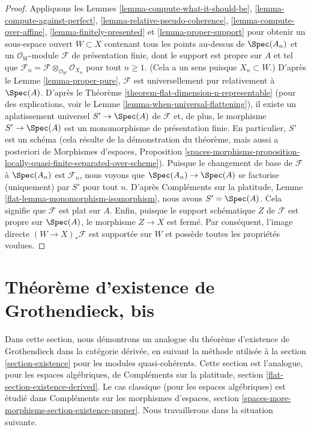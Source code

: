 \begin{proof}
Appliquons les Lemmes \ref{lemma-compute-what-it-should-be},
\ref{lemma-compute-against-perfect},
\ref{lemma-relative-pseudo-coherence},
\ref{lemma-compute-over-affine},
\ref{lemma-finitely-presented} et
\ref{lemma-proper-support}
pour obtenir un sous-espace ouvert $W \subset X$ contenant tous les points
au-dessus de $\Spec(A_n)$
et un $\mathcal{O}_W$-module $\mathcal{F}$ de présentation finie,
dont le support est propre sur $A$ et tel que
$\mathcal{F}_n = \mathcal{F} \otimes_{\mathcal{O}_W} \mathcal{O}_{X_n}$
pour tout $n \geq 1$. (Cela a un sens puisque $X_n \subset W$.)
D'après le Lemme \ref{lemma-proper-pure}, $\mathcal{F}$
est universellement pur relativement à $\Spec(A)$.
D'après le Théorème \ref{theorem-flat-dimension-n-representable}
(pour des explications, voir le Lemme \ref{lemma-when-universal-flattening}),
il existe un aplatissement universel $S' \to \Spec(A)$
de $\mathcal{F}$ et, de plus, le morphisme $S' \to \Spec(A)$
est un monomorphisme de présentation finie.
En particulier, $S'$ est un schéma (cela résulte de la démonstration
du théorème, mais aussi a posteriori de
Morphismes d'espaces, Proposition
\ref{spaces-morphisms-proposition-locally-quasi-finite-separated-over-scheme}).
Puisque le changement de base de $\mathcal{F}$ à $\Spec(A_n)$
est $\mathcal{F}_n$, nous voyons que $\Spec(A_n) \to \Spec(A)$
se factorise (uniquement) par $S'$ pour tout $n$.
D'après Compléments sur la platitude, Lemme \ref{flat-lemma-monomorphism-isomorphism},
nous avons $S' = \Spec(A)$.
Cela signifie que $\mathcal{F}$ est plat sur $A$.
Enfin, puisque le support schématique $Z$ de $\mathcal{F}$
est propre sur $\Spec(A)$, le morphisme $Z \to X$ est fermé.
Par conséquent, l'image directe $(W \to X)_*\mathcal{F}$ est supportée
sur $W$ et possède toutes les propriétés voulues.
\end{proof}







\section{Théorème d'existence de Grothendieck, bis}
\label{section-existence-derived}

\noindent
Dans cette section, nous démontrons un analogue du théorème d'existence de Grothendieck
dans la catégorie dérivée, en suivant la méthode utilisée à la
section \ref{section-existence} pour les modules quasi-cohérents.
Cette section est l'analogue, pour les espaces algébriques, de
Compléments sur la platitude, section \ref{flat-section-existence-derived}.
Le cas classique (pour les espaces algébriques)
est étudié dans Compléments sur les morphismes d'espaces, section
\ref{spaces-more-morphisms-section-existence-proper}.
Nous travaillerons dans la situation suivante.

